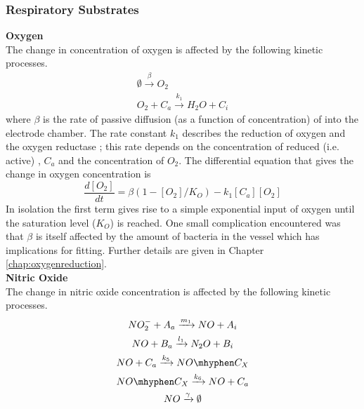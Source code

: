 \subsubsection{Respiratory Substrates}
{\bf Oxygen}\\
The change in concentration of oxygen is affected by the following kinetic processes.
\begin{equation*}
\begin{gathered}
\emptyset\xrightarrow{\beta} O_2\\
O_2 + C_a\xrightarrow{k_1} H_{2}O + C_i
\end{gathered}
\end{equation*}
where $\beta$ is the rate of passive diffusion (as a function of \cOxygen{} concentration) of \cOxygen{} into the electrode chamber. The rate constant $k_1$ describes the reduction of oxygen and the oxygen reductase \cbbthree{}; this rate depends on the concentration of reduced (i.e. active) \cbbthree{}, $C_a$ and the concentration of $O_2$.
The differential equation that gives the change in oxygen concentration is
\begin{equation}
\frac{d[O_2]}{dt} = \beta(1-[O_2]/K_O) - k_{1}[C_a][O_2]
\label{eq:oxygen}
\end{equation}
In isolation the first term gives rise to a simple exponential input of oxygen until the saturation level ($K_O$) is reached. One small complication encountered was that $\beta$ is itself affected by the amount of bacteria in the vessel which has implications for fitting. Further details are given in Chapter \ref{chap:oxygenreduction}.\\
{\bf Nitric Oxide}\\
The change in nitric oxide concentration is affected by the following kinetic processes.
\begin{equation*}
\begin{gathered}
NO_2^- + A_a \xrightarrow{m_1} NO + A_i\\
NO + B_a \xrightarrow{l_1} N_2O + B_i\\
NO + C_a \xrightarrow{k_5} NO\mhyphen C_X\\
NO\mhyphen C_X \xrightarrow{k_6} NO + C_a\\
NO \xrightarrow{\gamma} \emptyset
\end{gathered}
\end{equation*}
